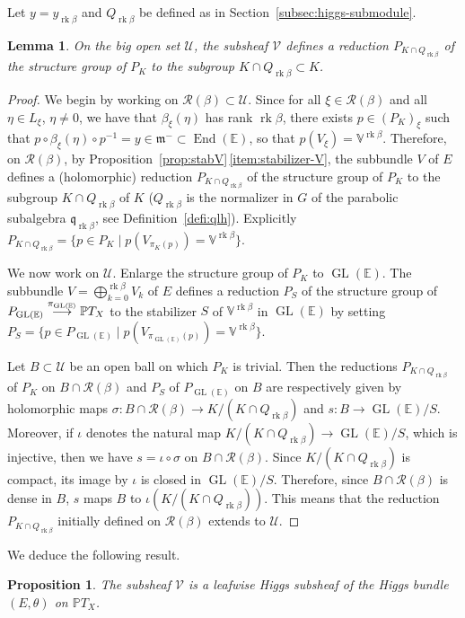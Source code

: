 \documentclass[10pt]{amsart}
\let\mathcal\mathscr
\newcommand{\To}[1]{\mathchoice{\xrightarrow{\textstyle\kern4pt#1\kern3pt}}{\stackrel{#1}{\longrightarrow}}{}{}}
\theoremstyle{plain}
\newtheorem{lemm}[theo]{Lemma}
\newtheorem{prop}[theo]{Proposition}
\theoremstyle{definition}
\DeclareMathOperator{\End}{End}
\DeclareMathOperator{\GL}{GL}
\DeclareMathOperator{\rk}{rk}
\newcommand{\cR}{\mathcal{R}}
\newcommand{\cU}{\mathcal{U}}
\newcommand{\cV}{\mathcal{V}}
\newcommand{\bE}{\mathbb{E}}
\newcommand{\PTX}{{\mathbb{P}T_X}}
\newcommand{\Vb}{\mathbb{V}^{\rgb}}
\newcommand{\fm}{\mathfrak{m}}
\newcommand{\fq}{\mathfrak{q}}
\newcommand{\rgb}{{\rk\beta}}
\begin{document}
Let $y=y_\rgb$ and $Q_{\rgb}$ be defined as in Section~\ref{subsec:higgs-submodule}.

\begin{lemm}\label{lemm:reduction}
On the big open set $\cU$, the subsheaf $\cV$ defines a reduction $P_{K\cap Q_\rgb}$ of the
structure group of $P_K$ to the subgroup $K\cap Q_\rgb\subset K$.
\end{lemm}

\begin{proof}
We begin by working on $\cR(\beta)\subset\cU$.
Since for
all $\xi\in\cR(\beta)$ and all \hbox{$\eta\in L_\xi$}, $\eta\neq 0$, we have that $\beta_\xi(\eta)$ has rank
$\rgb$, there exists $p\in (P_K)_\xi$ such that \hbox{$p\circ\beta_\xi(\eta)\circ p^{-1}=y\in\fm^-\subset\End
(\bE)$}, so
that $p (V_\xi)=\Vb$. Therefore, on
$\cR(\beta)$, by Proposition~\ref{prop:stabV}\,\eqref{item:stabilizer-V},
the subbundle $V$ of $ E$ defines a (holomorphic) reduction $P_{K\cap Q_\rgb}$ of the
structure group of $P_K$ to the subgroup $K\cap Q_\rgb$ of $K$ ($Q_\rgb$ is the normalizer in $G$ of the
parabolic subalgebra $\fq_\rgb$, see Definition~\ref{defi:qlh}). Explicitly $P_{K\cap Q_\rgb}=\{p\in P_K\mid
p(V_{\pi_K(p)})=\Vb \}$.

We now work on $\cU$. Enlarge the structure group of $P_K$ to $\GL(\bE)$. The subbundle
$V=\bigoplus_{k=0}^\rgb V_k$ of $ E$ defines a reduction $P_S$ of the structure group of $P_{\GL(\bE)} \To{\pi_{\GL(\bE)}}\PTX$ to the
stabilizer $S$ of $\Vb$ in $\GL(\bE)$ by setting \hbox{$P_S\!=\!\{p\!\in\!P_{\GL(\bE)}\mid p (V_{\pi_{\GL(\bE)}(p)})\!=\!\Vb\}$}.

Let $B\subset\cU$ be an open ball on which $P_K$ is trivial. Then the reductions $P_{K\cap Q_\rgb}$ of
$P_K$ on $B\cap\cR(\beta)$
and $P_S$ of $P_{\GL(\bE)}$ on $B$ are respectively given by holomorphic maps $\sigma:B\cap\cR(\beta)\to
K/(K\cap Q_\rgb)$ and $s:B\to \GL(\bE)/S$. Moreover, if $\iota$ denotes the natural map $K/(K\cap Q_\rgb)\to
\GL(\bE)/S$, which is injective, then we have $s=\iota\circ\sigma$ on $B\cap\cR(\beta)$. Since
$K/(K\cap Q_\rgb)$ is compact, its image by $\iota$ is closed in $\GL(\bE)/S$. Therefore, since $B\cap\cR(\beta)$ is dense in $B$, $s$ maps $B$ to $\iota(K/(K\cap Q_\rgb))$. This means that the reduction
$P_{K\cap Q_\rgb}$ initially defined on $\cR(\beta)$ extends to $\cU$.
\end{proof}

We deduce the following result.

\begin{prop}\label{prop:VHiggs}
The subsheaf $\cV$ is a leafwise Higgs subsheaf of the Higgs bundle $(E,\theta)$ on $\PTX$.
\end{prop}
\end{document}
